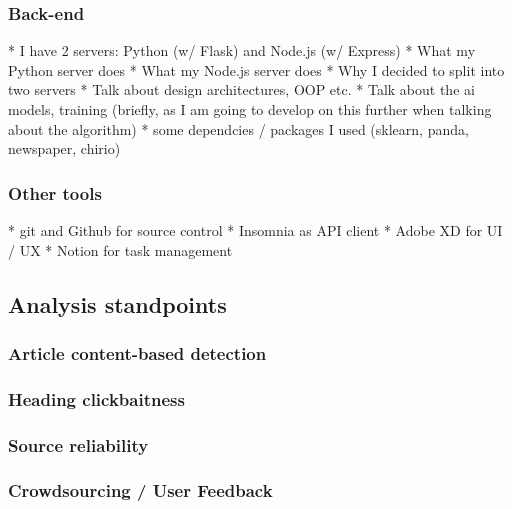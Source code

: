 \subsubsection{Back-end}
  * I have 2 servers: Python (w/ Flask) and Node.js (w/ Express)
  * What my Python server does
  * What my Node.js server does
  * Why I decided to split into two servers 
  * Talk about design architectures, OOP etc.
  * Talk about the ai models, training (briefly, as I am going to develop on this further when talking about the algorithm)
  * some dependcies / packages I used (sklearn, panda, newspaper, chirio)
\subsubsection{Other tools}
  * git and Github for source control
  * Insomnia as API client
  * Adobe XD for UI / UX
  * Notion for task management

\subsection{Analysis standpoints}
\subsubsection{Article content-based detection}
\subsubsection{Heading clickbaitness}
\subsubsection{Source reliability}
\subsubsection{Crowdsourcing / User Feedback}